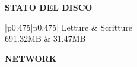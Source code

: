\documentclass[letterpaper, 11pt]{article}
\begin{document}
\begin{center}
\textbf{STATO DEL DISCO}
\end{center}

\begin{center}
  \setlength{\arrayrulewidth}{0.9pt}
  \begin{tabular}{{|p{0.475\textwidth}|p{0.475\textwidth}|}}
    \hline
        Letture & Scritture\\
    \hline
        691.32MB & 31.47MB\\
    \hline
  \end{tabular}
\end{center}

\begin{center}
\textbf{NETWORK}
\end{center}
\end{document}
